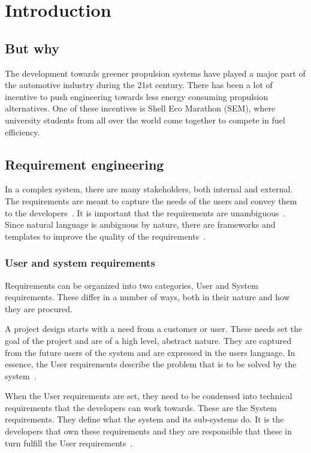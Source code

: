 \chapter{Introduction}
\section{But why}
The development towards greener propulsion systems have played a major part of the automotive industry during the 21st century. There has been a lot of incentive to push engineering towards less energy consuming propulsion alternatives. One of these incentives is Shell Eco Marathon (SEM), where university students from all over the world come together to compete in fuel efficiency.

\section{Requirement engineering}
In a complex system, there are many stakeholders, both internal and external.
The requirements are meant to capture the needs of the users and convey them to
the developers~\cite{ibm_req}. It is important that the requirements are
unambiguous~\cite{ibm_req, rupp2014}. Since natural language is ambiguous by
nature, there are frameworks and templates to improve the quality of the
requirements~\cite{rupp2014}. 

\subsection{User and system requirements}
Requirements can be organized into two categories, User and System requirements.
These differ in a number of ways, both in their nature and how they are
procured.

A project design starts with a need from a customer or user. These needs set the
goal of the project and are of a high level, abstract nature. They are captured
from the future users of the system and are expressed in the users language. In
essence, the User requirements describe the problem that is to be solved by the
system~\cite{ibm_req}. 

When the User requirements are set, they need to be condensed into technical
requirements that the developers can work towards. These are the System
requirements. They define what the system and its sub-systems do. It is the
developers that own these requirements and they are responsible that these in
turn fulfill the User requirements~\cite{ibm_req}.

